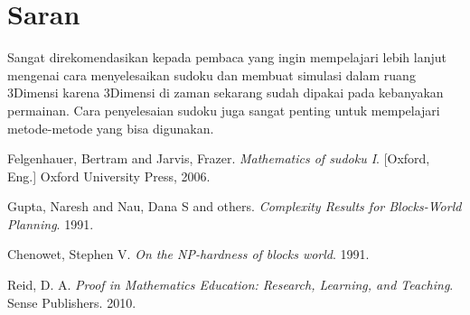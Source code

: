 \documentclass[11pt,a4paper]{report}
\begin{document}
\section{Saran}
Sangat direkomendasikan kepada pembaca yang ingin mempelajari lebih lanjut mengenai cara menyelesaikan sudoku dan membuat simulasi dalam ruang 3Dimensi karena 3Dimensi di zaman sekarang sudah dipakai pada kebanyakan permainan. Cara penyelesaian sudoku juga sangat penting untuk mempelajari
metode-metode yang bisa digunakan.

\begin{thebibliography}{9}

\bibitem{}
	Felgenhauer, Bertram and Jarvis, Frazer.
	\emph{Mathematics of sudoku I}.
	[Oxford, Eng.] Oxford University Press,
	2006.

\bibitem{}
	Gupta, Naresh and Nau, Dana S and others.
	\emph{Complexity Results for Blocks-World Planning}.
	1991.

\bibitem{}
	Chenowet, Stephen V.
	\emph{On the NP-hardness of blocks world}.
	1991.
	

\bibitem{}
	Reid, D. A.
	\emph{Proof in Mathematics Education: Research, Learning, and Teaching}.
	Sense Publishers.
	2010.

\end{thebibliography}
\end{document}
